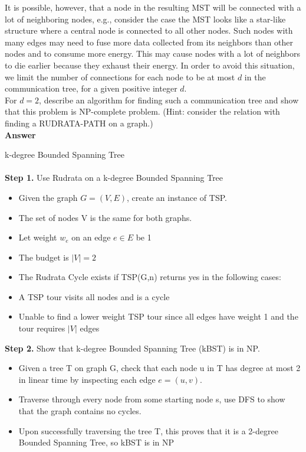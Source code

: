 \documentclass{article}
\begin{document}
\noindent It is possible, however, that a node in the resulting MST
will be connected with a lot of neighboring nodes, e.g., consider the
case the MST looks like a star-like structure where a central node is
connected to all other nodes. Such nodes with many edges may need to
fuse more data collected from its neighbors than other nodes and to
consume more energy.  This may cause nodes with a lot of neighbors to
die earlier because they exhaust their energy.  In order to avoid this
situation, we limit the number of connections for each node to be at
most $d$ in the communication tree, for a given positive integer
$d$.\\

 For $d = 2$, describe an algorithm for finding such
a communication tree and show that this problem is NP-complete
problem.  (Hint: consider the relation with finding a RUDRATA-PATH on
a graph.)\\

\textbf{ Answer }
\vspace{0.1in}
\begin{adjustwidth}{1.8em}{0pt}
k-degree Bounded Spanning Tree\\ \\
\textbf{Step 1.} Use Rudrata on a k-degree Bounded Spanning Tree
\begin{itemize}
\item Given the graph $G = (V,E)$, create an instance of TSP.
\item The set of nodes V is the same for both graphs.
\item Let weight $w_{e}$ on an edge $e \in E$ be 1
\item The budget is $|V| = 2$
\item The Rudrata Cycle exists if TSP(G,n) returns yes in the following cases:
\item A TSP tour visits all nodes and is a cycle
\item Unable to find a lower weight TSP tour since all edges have weight 1 and the tour requires $|V|$ edges
\end{itemize}
\textbf{Step 2.} Show that k-degree Bounded Spanning Tree (kBST) is in NP.
\begin{itemize}
\item Given a tree T on graph G, check that each node u in T has degree at most 2 in linear time by inspecting each edge $e = (u,v)$.
\item Traverse through every node from some starting node s, use DFS to show that the graph contains no cycles.
\item Upon successfully traversing the tree T, this proves that it is a 2-degree Bounded Spanning Tree, so kBST is in NP
\end{itemize}
\end{adjustwidth}
\vspace{0.1in}
\end{document}
